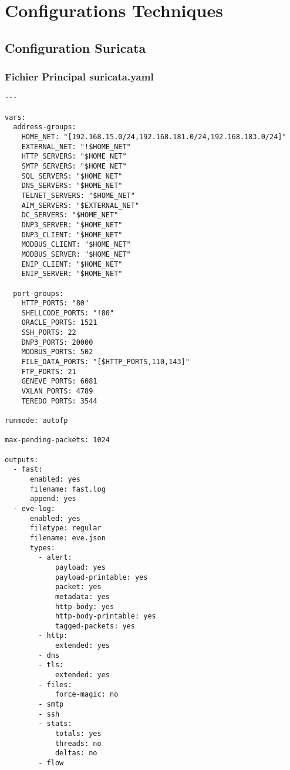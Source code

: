 
\chapter{Configurations Techniques}

\section{Configuration Suricata}

\subsection{Fichier Principal suricata.yaml}

\begin{lstlisting}[style=yamlstyle,caption=Configuration Suricata pour environnement hospitalier]
%YAML 1.1
---

vars:
  address-groups:
    HOME_NET: "[192.168.15.0/24,192.168.181.0/24,192.168.183.0/24]"
    EXTERNAL_NET: "!$HOME_NET"
    HTTP_SERVERS: "$HOME_NET"
    SMTP_SERVERS: "$HOME_NET"
    SQL_SERVERS: "$HOME_NET"
    DNS_SERVERS: "$HOME_NET"
    TELNET_SERVERS: "$HOME_NET"
    AIM_SERVERS: "$EXTERNAL_NET"
    DC_SERVERS: "$HOME_NET"
    DNP3_SERVER: "$HOME_NET"
    DNP3_CLIENT: "$HOME_NET"
    MODBUS_CLIENT: "$HOME_NET"
    MODBUS_SERVER: "$HOME_NET"
    ENIP_CLIENT: "$HOME_NET"
    ENIP_SERVER: "$HOME_NET"

  port-groups:
    HTTP_PORTS: "80"
    SHELLCODE_PORTS: "!80"
    ORACLE_PORTS: 1521
    SSH_PORTS: 22
    DNP3_PORTS: 20000
    MODBUS_PORTS: 502
    FILE_DATA_PORTS: "[$HTTP_PORTS,110,143]"
    FTP_PORTS: 21
    GENEVE_PORTS: 6081
    VXLAN_PORTS: 4789
    TEREDO_PORTS: 3544

runmode: autofp

max-pending-packets: 1024

outputs:
  - fast:
      enabled: yes
      filename: fast.log
      append: yes
  - eve-log:
      enabled: yes
      filetype: regular
      filename: eve.json
      types:
        - alert:
            payload: yes
            payload-printable: yes
            packet: yes
            metadata: yes
            http-body: yes
            http-body-printable: yes
            tagged-packets: yes
        - http:
            extended: yes
        - dns
        - tls:
            extended: yes
        - files:
            force-magic: no
        - smtp
        - ssh
        - stats:
            totals: yes
            threads: no
            deltas: no
        - flow


\end{lstlisting}
